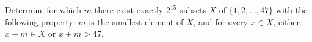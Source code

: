 Determine for which $m$ there exist exactly $2^{15}$ subsets $X$ of $\{1,2,...,47\}$ with the following property: $m$ is the smallest element of $X$, and for every $x \in  X$, either $x+m \in X$ or $x+m > 47$.